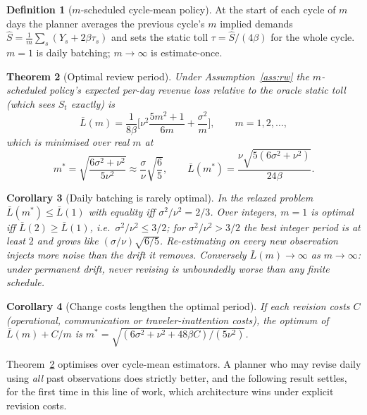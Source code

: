 \documentclass[11pt]{article}
\newtheorem{theorem}{Theorem}[section]
\newtheorem{corollary}[theorem]{Corollary}
\theoremstyle{definition}
\newtheorem{definition}[theorem]{Definition}
\theoremstyle{remark}
\begin{document}
\begin{definition}[$m$-scheduled cycle-mean policy]\label{def:sched}
At the start of each cycle of $m$ days the planner averages the previous cycle's $m$ implied demands $\hat S=\frac1m\sum_s(Y_s+2\beta\tau_s)$ and sets the static toll $\tau=\hat S/(4\beta)$ for the whole cycle. $m=1$ is daily batching; $m\to\infty$ is estimate-once.
\end{definition}

\begin{theorem}[Optimal review period]\label{thm:review}
Under Assumption~\ref{ass:rw} the $m$-scheduled policy's expected per-day revenue loss relative to the oracle static toll (which sees $S_t$ exactly) is
\[\bar L(m)=\frac1{8\beta}\Big[\nu^2\frac{5m^2+1}{6m}+\frac{\sigma^2}m\Big],\qquad m=1,2,\dots,\]
which is minimised over real $m$ at
\[m^*=\sqrt{\frac{6\sigma^2+\nu^2}{5\nu^2}}\approx\frac\sigma\nu\sqrt{\frac65},\qquad\bar L(m^*)=\frac{\nu\sqrt{5(6\sigma^2+\nu^2)}}{24\beta}.\]
\end{theorem}

\begin{corollary}[Daily batching is rarely optimal]\label{cor:daily}
In the relaxed problem $\bar L(m^*)\le\bar L(1)$ with equality iff $\sigma^2/\nu^2=2/3$. Over integers, $m=1$ is optimal iff $\bar L(2)\ge\bar L(1)$, i.e.\ $\sigma^2/\nu^2\le3/2$; for $\sigma^2/\nu^2>3/2$ the best integer period is at least $2$ and grows like $(\sigma/\nu)\sqrt{6/5}$. Re-estimating on every new observation injects more noise than the drift it removes. Conversely $\bar L(m)\to\infty$ as $m\to\infty$: under permanent drift, never revising is unboundedly worse than any finite schedule.
\end{corollary}

\begin{corollary}[Change costs lengthen the optimal period]\label{cor:cost}
If each revision costs $C$ (operational, communication or traveler-inattention costs), the optimum of $\bar L(m)+C/m$ is $m^*=\sqrt{(6\sigma^2+\nu^2+48\beta C)/(5\nu^2)}$.
\end{corollary}

Theorem~\ref{thm:review} optimises over cycle-mean estimators. A planner who may revise daily using \emph{all} past observations does strictly better, and the following result settles, for the first time in this line of work, which architecture wins under explicit revision costs.
\end{document}
